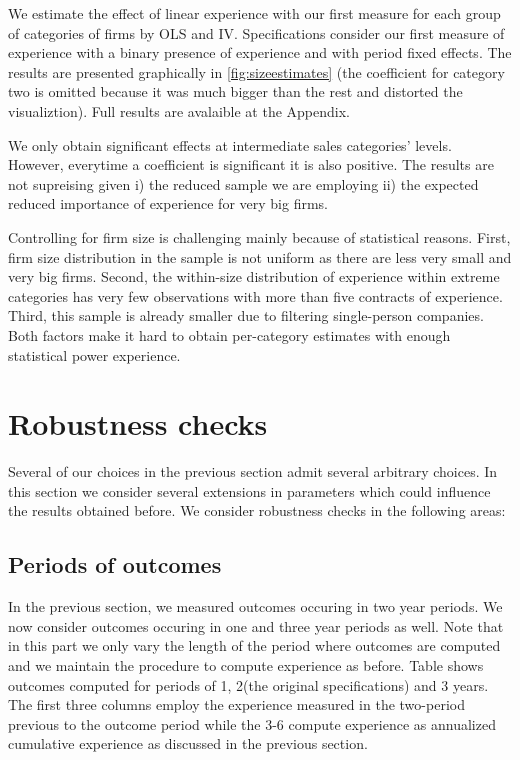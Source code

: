 

We estimate the effect of linear experience with our first measure for each group of categories of firms by OLS and IV. Specifications consider our first measure of experience with a binary presence of experience and with period fixed effects. The results are presented graphically in \ref{fig:sizeestimates} (the coefficient for category two is omitted because it was much bigger than the rest and distorted the visualiztion). Full results are avalaible at the Appendix.

We only obtain significant effects at intermediate sales categories' levels. However, everytime a coefficient is significant it is also positive. The results are not supreising given i) the reduced sample we are employing ii) the expected reduced importance of experience for very big firms.

Controlling for firm size is challenging mainly because of statistical reasons. First, firm size distribution in the sample is not uniform as there are less very small and very big firms. Second, the within-size distribution of experience within extreme categories has very few observations with more than five contracts of experience. Third, this sample is already smaller due to filtering single-person companies. Both factors make it hard to obtain per-category estimates with enough statistical power experience.

\newpage





%
\section{Robustness checks}
Several of our choices in the previous section admit several arbitrary choices. In this section we consider several extensions in parameters which could influence the results obtained before. We consider robustness checks in the following areas:

\subsection{Periods of outcomes}
In the previous section, we measured outcomes occuring in two year periods. We now consider outcomes occuring in one and three year periods as well. Note that in this part we only vary the length of the period where outcomes are computed and we maintain the procedure to compute experience as before. Table shows outcomes computed for periods of 1, 2(the original specifications) and 3 years. The first three columns employ the experience measured in the two-period previous to the outcome period while the 3-6 compute experience as annualized cumulative experience as discussed in the previous section.

